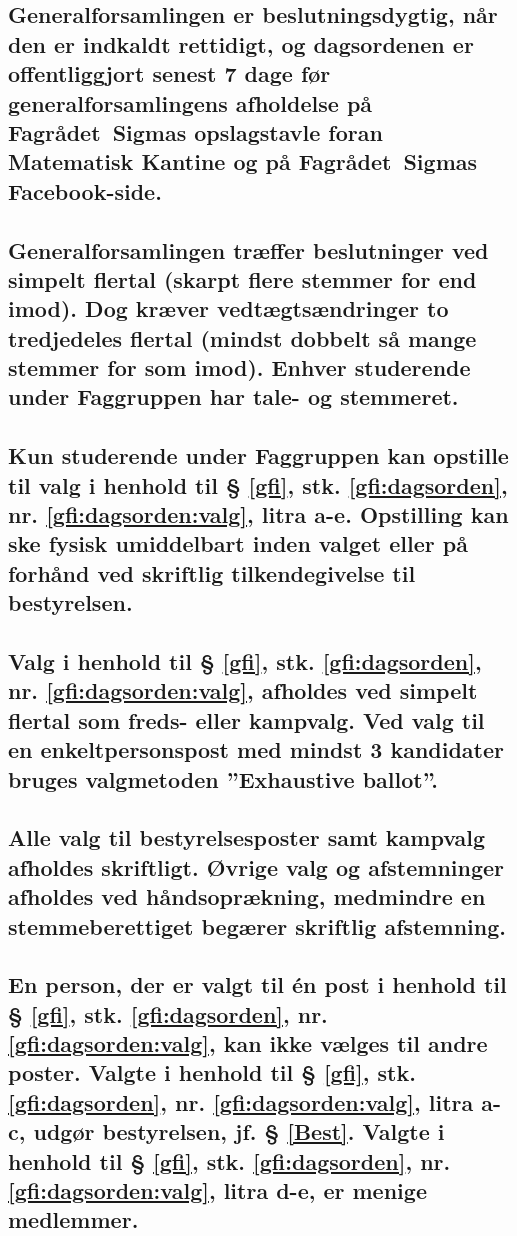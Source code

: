 \documentclass[10pt, danish]{article}
\newcommand{\fagr}{Fagrådet~Sigma}
\begin{document}
	\subsection{Generalforsamlingen er beslutningsdygtig, når den er indkaldt rettidigt, og dagsordenen er offentliggjort senest 7 dage før generalforsamlingens afholdelse på \fagr{}s opslagstavle foran Matematisk Kantine og på \fagr{}s Facebook-side.}\label{gf:rettid}
	
	\subsection{Generalforsamlingen træffer beslutninger ved simpelt flertal (skarpt flere stemmer for end imod). Dog kræver vedtægtsændringer to tredjedeles flertal (mindst dobbelt så mange stemmer for som imod). Enhver studerende under Faggruppen har tale- og stemmeret.}
	
        \subsection{Kun studerende under Faggruppen kan opstille til valg i henhold til § \ref{gfi}, stk. \ref{gfi:dagsorden}, nr. \ref{gfi:dagsorden:valg}, litra a-e. Opstilling kan ske fysisk umiddelbart inden valget eller på forhånd ved skriftlig tilkendegivelse til bestyrelsen.}\label{gf:studerende}
	
        \subsection{Valg i henhold til § \ref{gfi}, stk. \ref{gfi:dagsorden}, nr. \ref{gfi:dagsorden:valg}, afholdes ved simpelt flertal som freds- eller kampvalg. Ved valg til en enkeltpersonspost med mindst 3 kandidater bruges valgmetoden ”Exhaustive ballot”.}\label{gf:menigtindvalgte}
	
	\subsection{Alle valg til bestyrelsesposter samt kampvalg afholdes skriftligt. Øvrige valg og afstemninger afholdes ved håndsoprækning, medmindre en stemmeberettiget begærer skriftlig afstemning.}\label{gf:bestyrelsesvalgte}
	
        \subsection{En person, der er valgt til én post i henhold til § \ref{gfi}, stk. \ref{gfi:dagsorden}, nr. \ref{gfi:dagsorden:valg}, kan ikke vælges til andre poster. Valgte i henhold til § \ref{gfi}, stk. \ref{gfi:dagsorden}, nr. \ref{gfi:dagsorden:valg}, litra a-c, udgør bestyrelsen, jf. § \ref{Best}. Valgte i henhold til § \ref{gfi}, stk. \ref{gfi:dagsorden}, nr. \ref{gfi:dagsorden:valg}, litra d-e, er menige medlemmer.}\label{gf:begrpost}
\end{document}
